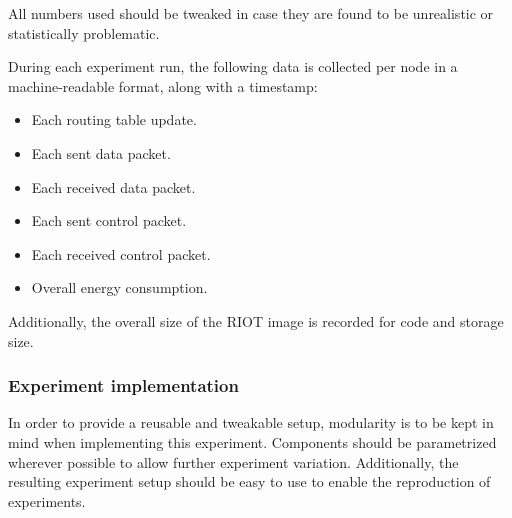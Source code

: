 \documentclass{acm_proc_article-sp}
\begin{document}
All numbers used should be tweaked in case they are found to be unrealistic or statistically problematic.

During each experiment run, the following data is collected per node in a machine-readable format, along with a timestamp:
\begin{itemize}
\item Each routing table update. %
\item Each sent data packet.
\item Each received data packet.
\item Each sent control packet.
\item Each received control packet.
\item Overall energy consumption.
\end{itemize}

Additionally, the overall size of the RIOT image is recorded for code and storage size.

\subsubsection{Experiment implementation}
\label{subsec:implementation}
In order to provide a reusable and tweakable setup, modularity is to be kept in mind when implementing this experiment. Components should be parametrized wherever possible to allow further experiment variation. Additionally, the resulting experiment setup should be easy to use to enable the reproduction of experiments.
\end{document}
